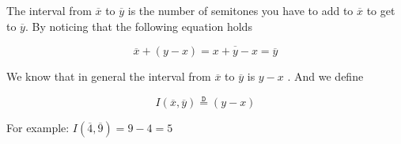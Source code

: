 \documentclass[preview]{standalone}
\begin{document}
\begin{center}
The interval from  $ \overline{x}$ to $ \overline{y }$ is the number of semitones you have to add to $ \overline{x}$ to get to $ \overline{y}$. By noticing that the following equation holds

	\[
	\overline{x}  +  \left( y  -  x \right) = \overline{x  +  y  -  x} = \overline{y}
	\]

  We know that in general the interval from $ \overline{x}$  to $ \overline{y}$ is $y  - x$ . And we define 


	\[
	I\left( \overline{x}, \overline{y}\right) \stackrel{\mathtt{D}}{=} (y  -  x)
	\]

  For example: $I\left( \overline{4}, \overline{9}\right) = 9  -  4 = 5$
\end{center}
\end{document}
